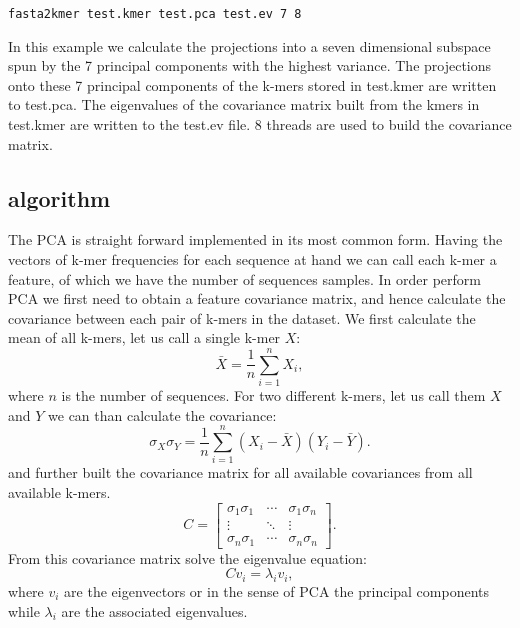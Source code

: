 \begin{lstlisting}
fasta2kmer test.kmer test.pca test.ev 7 8
\end{lstlisting}
In this example we calculate the projections into a seven dimensional
subspace spun by the 7 principal components with the highest
variance. The projections  onto these
7 principal components of the k-mers stored in test.kmer are written
to test.pca. The eigenvalues of the 
covariance matrix built from the kmers in test.kmer are written to the
test.ev file. 8 threads are used to build the covariance
matrix.

\subsection{algorithm}

The PCA is straight forward implemented in its most common
form. Having the vectors of k-mer frequencies for each sequence at
hand we can call each k-mer a feature, of which we have the number of sequences
samples. In order perform PCA we first need to obtain a feature
covariance matrix, and hence calculate the covariance between each pair of
k-mers in the dataset. We first calculate the mean of all
k-mers, let us call a single k-mer $X$:
\begin{equation}
  \bar{X} = \frac{1}{n}\sum_{i=1}^{n}X_i,
\end{equation}
where $n$ is the number of sequences. For two different k-mers, let us
call them $X$ and $Y$ we can than calculate the covariance:
\begin{equation}
  \sigma_X\sigma_Y =
  \frac{1}{n}\sum_{i=1}^{n}(X_i-\bar{X})(Y_i-\bar{Y}). \label{eqn-covariance}
\end{equation}
and further built the covariance matrix for all available covariances
from all available k-mers.
\begin{equation}
  C = \left[
    \begin{array}{ccc}
      \sigma_1\sigma_1 & \cdots & \sigma_1\sigma_n \\
      \vdots & \ddots & \vdots \\
      \sigma_n\sigma_1 & \cdots & \sigma_n\sigma_n
    \end{array}
    \right]. \label{eqn-covariance-matrix}
\end{equation}
From this covariance matrix solve the eigenvalue equation:
\begin{equation}
  Cv_i=\lambda_i v_i \label{eqn-eigen},
\end{equation}
where $v_i$ are the eigenvectors or in the sense of PCA the principal
components while $\lambda_i$ are the associated eigenvalues.

